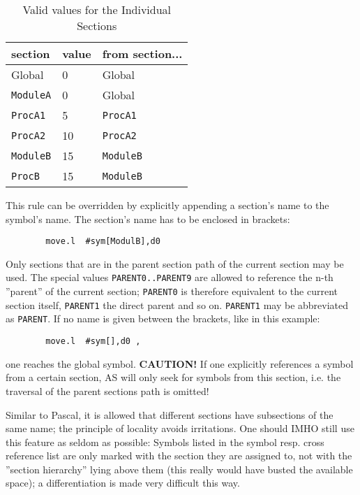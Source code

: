 \documentclass[12pt,twoside]{report}
\newcommand{\bb}[1]{{\bf #1}}
\newcommand{\tty}[1]{{\tt #1}}
\newcommand{\asname}{{AS}}
\begin{document}
\begin{table*}[htb]
\begin{center}\begin{tabular}{|l|l|l|}
\hline
section        &   value &   from section... \\
\hline
\hline
Global         &     0   &   Global \\
\hline
\tty{ModuleA}  &     0   &   Global \\
\hline
\tty{ProcA1}   &     5   &   \tty{ProcA1} \\
\hline
\tty{ProcA2}   &    10   &   \tty{ProcA2} \\
\hline
\tty{ModuleB}  &    15   &   \tty{ModuleB} \\
\hline
\tty{ProcB}    &    15   &   \tty{ModuleB} \\
\hline
\end{tabular}\end{center}
\caption{Valid values for the Individual Sections\label{TabSymErg}}
\end{table*}
This rule can be overridden by explicitly appending a section's name
to the symbol's name.  The section's name has to be enclosed in
brackets:
\begin{verbatim}
        move.l  #sym[ModulB],d0
\end{verbatim}
Only sections that are in the parent section path of the current
section may be used.  The special values \tty{PARENT0..PARENT9} are allowed
to reference the n-th ''parent'' of the current section; \tty{PARENT0} is
therefore equivalent to the current section itself, \tty{PARENT1} the
direct parent and so on.  \tty{PARENT1} may be abbreviated as \tty{PARENT}.  If
no name is given between the brackets, like in this example:
\begin{verbatim}
        move.l  #sym[],d0 ,
\end{verbatim}
one reaches the global symbol.  \bb{CAUTION!}  If one explicitly
references a symbol from a certain section, \asname{} will only seek for
symbols from this section, i.e. the traversal of the parent sections
path is omitted!

Similar to Pascal, it is allowed that different sections have
subsections of the same name; the principle of locality avoids
irritations.  One should IMHO still use this feature as seldom as
possible: Symbols listed in the symbol resp. cross reference list are
only marked with the section they are assigned to, not with the
''section hierarchy'' lying above them (this really would have busted
the available space); a differentiation is made very difficult this
way.
\end{document}
